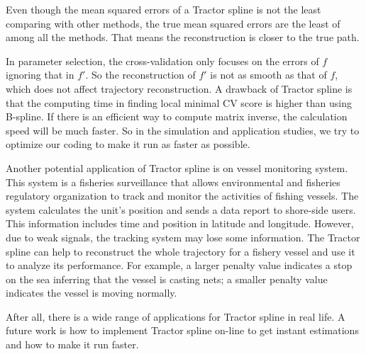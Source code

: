 Even though the mean squared errors of a Tractor spline is not the least comparing with other methods, the true mean squared errors are the least of among all the methods. That means the reconstruction is closer to the true path. 

In parameter selection, the cross-validation only focuses on the errors of $f$ ignoring that in $f'$. So the reconstruction of $f'$ is not as smooth as that of $f$, which does not affect trajectory reconstruction. A drawback of Tractor spline is that the computing time in finding local minimal CV score is higher than using B-spline. If there is an efficient way to compute matrix inverse, the calculation speed will be much faster. So in the simulation and application studies, we try to optimize our coding to make it run as faster as possible.

Another potential application of Tractor spline is on vessel monitoring system. This system is a fisheries surveillance that allows environmental and fisheries regulatory organization to track and monitor the activities of fishing vessels. The system calculates the unit's position and sends a data report to shore-side users. This information includes time and position in latitude and longitude. However, due to weak signals, the tracking system may lose some information. The Tractor spline can help to reconstruct the whole trajectory for a fishery vessel and use it to analyze its performance. For example, a larger penalty value indicates a stop on the sea inferring that the vessel is casting nets; a smaller penalty value indicates the vessel is moving normally. 

After all, there is a wide range of applications for Tractor spline in real life. A future work is how to implement Tractor spline on-line to get instant estimations and how to make it run faster. 

